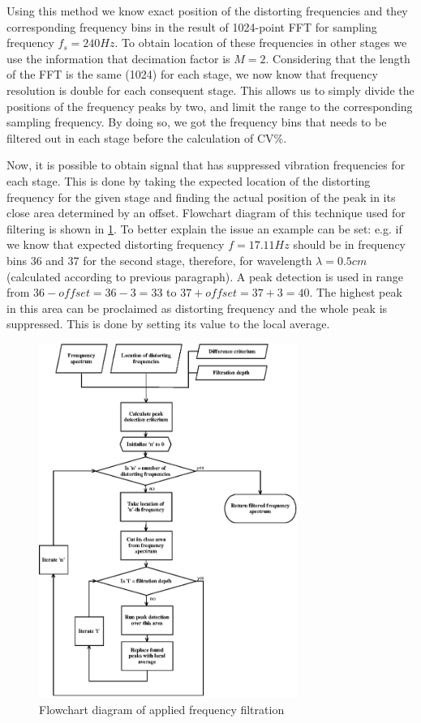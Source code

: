 \documentclass[twoside]{ctuthesis}
\theoremstyle{plain}
\theoremstyle{definition}
\theoremstyle{note}
\begin{document}
Using this method we know exact position of the distorting frequencies and they corresponding frequency bins in the result of 1024-point FFT for sampling frequency $f_s=240Hz$. To obtain location of these frequencies in other stages we use the information that decimation factor is $M=2$. Considering that the length of the FFT is the same (1024) for each stage, we now know that frequency resolution is double for each consequent stage. This allows us to simply divide the positions of the frequency peaks by two, and limit the range to the corresponding sampling frequency. By doing so, we got the frequency bins that needs to be filtered out in each stage before the calculation of CV\%.

Now, it is possible to obtain signal that has suppressed vibration frequencies for each stage. This is done by taking the expected location of the distorting frequency for the given stage and finding the actual position of the peak in its close area determined by an offset. Flowchart diagram of this technique used for filtering is shown in \ref{fig:frequencyFiltration}. To better explain the issue an example can be set: e.g. if we know that expected distorting frequency $f=17.11Hz$ should be in frequency bins 36 and 37 for the second stage, therefore, for wavelength $\lambda=0.5cm$ (calculated according to previous paragraph). A peak detection is used in range from $36-offset=36-3=33$ to $37+offset=37+3=40$. The highest peak in this area can be proclaimed as distorting frequency and the whole peak is suppressed. This is done by setting its value to the local average.

\begin{figure}[h]
	\centering
	\includegraphics[width=0.75\textwidth]{frequencyFiltration.eps}
	\caption{Flowchart diagram of applied frequency filtration}
	\label{fig:frequencyFiltration}
\end{figure}
\end{document}

